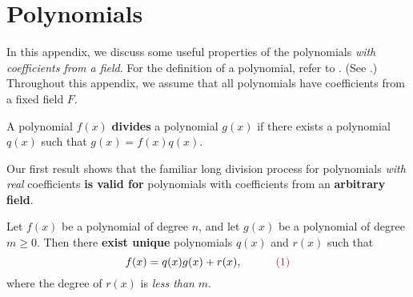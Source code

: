 \section{Polynomials} \label{sec 8.e}

In this appendix, we discuss some useful properties of the polynomials \emph{with coefficients from a field}.
For the definition of a polynomial, refer to .
(See .)
Throughout this appendix, we assume that all polynomials have coefficients from a fixed field \(F\).

\begin{appendix definition} \label{def e.1}
A polynomial \(f(x)\) \textbf{divides} a polynomial \(g(x)\) if there exists a polynomial \(q(x)\) such that \(g(x) = f(x)q(x)\).
\end{appendix definition}

Our first result shows that the familiar long division process for polynomials \emph{with real} coefficients \textbf{is valid for} polynomials with coefficients from an \textbf{arbitrary field}.

\begin{appendix theorem}  \label{thm e.1}
Let \(f(x)\) be a polynomial of degree \(n\), and let \(g(x)\) be a polynomial of degree \(m \ge 0\).
Then there \textbf{exist unique} polynomials \(q(x)\) and \(r(x)\) such that
\[
    f(x) = q(x)g(x) + r(x), \quad \quad \quad \MAROON{(1)}
\]
where the degree of \(r(x)\) is \emph{less than} \(m\).
\end{appendix theorem}


